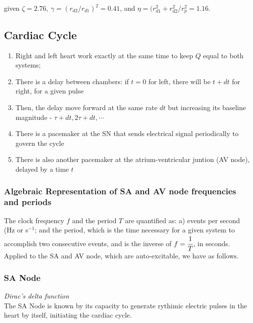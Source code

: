 given $\zeta = 2.76, \ \gamma = (r_{d2}/r_{d1})^2 = 0.41$, and $\eta = (r^2_{d1} + r^2_{d2}/r^2_{p} = 1.16$. %

\newpage
\subsection{Cardiac Cycle}

\begin{enumerate}
    \item Right and left heart work exactly at the same time to keep $Q$ equal to both systems;
    \item There is a delay between chambers: if $t = 0$ for left, there will be $t + dt$ for right, for a given pulse
    \item Then, the delay move forward at the same rate $dt$ but increasing its baseline magnitude - $\tau + dt, 2 \tau + dt, \cdots$

    \item There is a pacemaker at the SN that sends electrical signal periodically to govern the cycle 
    \item There is also another pacemaker at the atrium-ventricular juntion (AV node), delayed by a time $t$
\end{enumerate}

\subsubsection{Algebraic Representation of SA and AV node frequencies and periods}

The clock frequency $f$ and the period $T$ are quantified as: a) events per second (Hz or s$^{-1}$; and the period, which is the time necessary for a given system to accomplish two consecutive events, and is the inverse of $f = \cfrac{1}{T}$, in seconds. Applied to the SA and AV node, which are auto-excitable, we have as follows.

\subsubsection*{SA Node}
\vspace{1em}

\emph{Dirac's delta function} \\

The SA Node is known by its capacity to generate rythimic electric pulses in the heart by itself, initiating the cardiac cycle. \\

